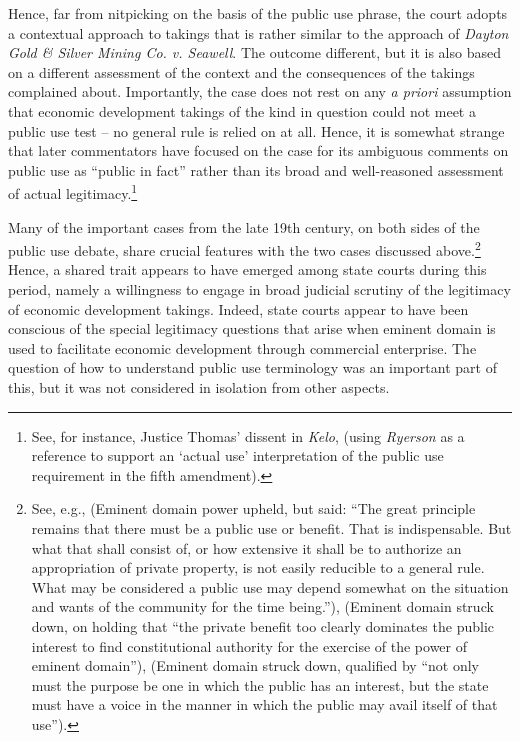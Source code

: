 Hence, far from nitpicking on the basis of the public use phrase, the court adopts a contextual approach to takings that is rather similar to the approach of {\it Dayton Gold \& Silver Mining Co. v. Seawell}. The outcome  different, but it is also based on a different assessment of the context and the consequences of the takings complained about. Importantly, the case does not rest on any {\it a priori} assumption that economic development takings of the kind in question could not meet a public use test -- no general rule is relied on at all. Hence, it is somewhat strange that later commentators have focused on the case for its ambiguous comments on public use as ``public in fact'' rather than its broad and well-reasoned assessment of actual legitimacy.\footnote{See, for instance, Justice Thomas' dissent in {\it Kelo}, \cite[513]{kelo05} (using {\it Ryerson} as a reference to support an `actual use' interpretation of the public use requirement in the fifth amendment).}

Many of the important cases from the late 19th century, on both sides of the public use debate, share crucial features with the two cases discussed above.\footnote{See, e.g., \cite{scudder32} (Eminent domain power upheld, but said: ``The great principle remains that there must be a public use or benefit. That is indispensable. But what that shall consist of, or how extensive it shall be to authorize an appropriation of private property, is not easily reducible to a general rule. What may be considered a public use may depend somewhat on the situation and wants of the community for the time being.''), \cite{fallsburg03} (Eminent domain struck down, on holding that ``the private benefit too clearly dominates the public interest to find constitutional authority for the exercise of the power of eminent domain''), \cite[538]{board91} (Eminent domain struck down, qualified by ``not only must the purpose be one in which the public has an interest, but the state must have a voice in the manner in which the public may avail itself of that use'').} Hence, a shared trait appears to have emerged among state courts during this period, namely a willingness to engage in broad judicial scrutiny of the legitimacy of economic development takings. Indeed, state courts appear to have been conscious of the special legitimacy questions that arise when eminent domain is used to facilitate economic development through commercial enterprise. The question of how to understand public use terminology was an important part of this, but it was not considered in isolation from other aspects.

